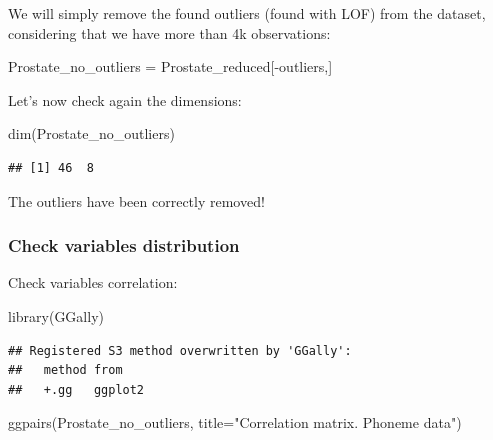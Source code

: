 \documentclass[
]{article}
\newenvironment{Shaded}{\begin{snugshade}}{\end{snugshade}}
\newcommand{\AttributeTok}[1]{\textcolor[rgb]{0.77,0.63,0.00}{#1}}
\newcommand{\FunctionTok}[1]{\textcolor[rgb]{0.00,0.00,0.00}{#1}}
\newcommand{\NormalTok}[1]{#1}
\newcommand{\OtherTok}[1]{\textcolor[rgb]{0.56,0.35,0.01}{#1}}
\newcommand{\SpecialCharTok}[1]{\textcolor[rgb]{0.00,0.00,0.00}{#1}}
\newcommand{\StringTok}[1]{\textcolor[rgb]{0.31,0.60,0.02}{#1}}
\begin{document}
We will simply remove the found outliers (found with LOF) from the
dataset, considering that we have more than 4k observations:

\begin{Shaded}
\begin{Highlighting}[]
\NormalTok{Prostate\_no\_outliers }\OtherTok{=}\NormalTok{ Prostate\_reduced[}\SpecialCharTok{{-}}\NormalTok{outliers,] }
\end{Highlighting}
\end{Shaded}

Let's now check again the dimensions:

\begin{Shaded}
\begin{Highlighting}[]
\FunctionTok{dim}\NormalTok{(Prostate\_no\_outliers)}
\end{Highlighting}
\end{Shaded}

\begin{verbatim}
## [1] 46  8
\end{verbatim}

The outliers have been correctly removed!

\hypertarget{check-variables-distribution}{%
\subsubsection{Check variables
distribution}\label{check-variables-distribution}}

Check variables correlation:

\begin{Shaded}
\begin{Highlighting}[]
\FunctionTok{library}\NormalTok{(GGally)}
\end{Highlighting}
\end{Shaded}

\begin{verbatim}
## Registered S3 method overwritten by 'GGally':
##   method from   
##   +.gg   ggplot2
\end{verbatim}

\begin{Shaded}
\begin{Highlighting}[]
\FunctionTok{ggpairs}\NormalTok{(Prostate\_no\_outliers,}
        \AttributeTok{title=}\StringTok{"Correlation matrix. Phoneme data"}\NormalTok{)}
\end{Highlighting}
\end{Shaded}
\end{document}
